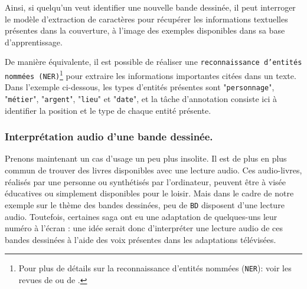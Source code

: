 			Ainsi, si quelqu'un veut identifier une nouvelle bande dessinée, il peut interroger le modèle d'extraction de caractères pour récupérer les informations textuelles présentes dans la couverture, à l'image des exemples disponibles dans sa base d'apprentissage.
			
			\begin{leftBarInformation}
				De manière équivalente, il est possible de réaliser une \texttt{reconnaissance d'entités nommées (\texttt{NER})}\footnote{Pour plus de détails sur la reconnaissance d'entités nommées (\texttt{NER}): voir les revues de \cite{goyal-etal:2018:recent-named-entity} ou de \cite{li-etal:2022:survey-deep-learning}.} pour extraire les informations importantes citées dans un texte.
				Dans l'exemple ci-dessous, les types d'entités présentes sont "\texttt{personnage}", "\texttt{métier}", "\texttt{argent}", "\texttt{lieu}" et "\texttt{date}", et la tâche d'annotation consiste ici à identifier la position et le type de chaque entité présente.
				
				\begin{quote}
				\end{quote}
			\end{leftBarInformation}
		
		
		\subsubsection{Interprétation audio d'une bande dessinée.}
		\label{section:2.1.2.D-PRESENTATION-ANNOTATION-EXEMPLES-TRANSCRIPTION}
		
			Prenons maintenant un cas d'usage un peu plus insolite.
			Il est de plus en plus commun de trouver des livres disponibles avec une lecture audio.
			Ces audio-livres, réalisés par une personne ou synthétisés par l'ordinateur, peuvent être à visée éducatives ou simplement disponibles pour le loisir.
			Mais dans le cadre de notre exemple sur le thème des bandes dessinées, peu de \texttt{BD} disposent d'une lecture audio.
			Toutefois, certaines saga ont eu une adaptation de quelques-uns leur numéro à l'écran : une idée serait donc d'interpréter une lecture audio de ces bandes dessinées à l'aide des voix présentes dans les adaptations télévisées.
			
